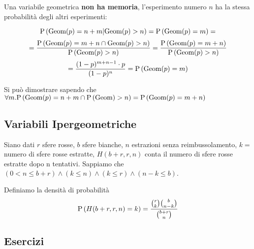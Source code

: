 Una variabile geometrica \textbf{non ha memoria}, l'esperimento numero $ n $ ha la stessa probabilità degli altri esperimenti:

\[ \text{P}\left(\text{Geom}(p) = n+m | \text{Geom}(p) > n\right) = \text{P}\left(\text{Geom}(p) = m\right)  = \]
\[ = \dfrac{\text{P}\left(\text{Geom}(p) = m + n \cap \text{Geom}(p) > n\right)}{\text{P}\left(\text{Geom}(p) > n\right)} = \dfrac{\text{P}\left(\text{Geom}(p) = m+n\right)}{\text{P}\left(\text{Geom}(p) > n\right)}\] 
\[= \dfrac{(1-p)^{m+n-1} \cdot p}{(1-p)^n} = \text{P}\left(\text{Geom}(p) = m\right) \]

Si può dimostrare sapendo che $ \forall m . \text{P}\left(\text{Geom}(p) = n+m \cap \text{P}\left(\text{Geom}\right) > n\right) = \text{P}\left(\text{Geom}(p) = m+n\right) $

\subsection{Variabili Ipergeometriche}

Siano dati $ r $ sfere rosse, $ b $ sfere bianche, $ n $ estrazioni senza reimbussolamento, $ k = $ numero di sfere rosse estratte, $ H(b+r, r, n) $ conta il numero di sfere rosse estratte dopo n tentativi. Sappiamo che $ (0 < n \leq b + r) \land (k \leq n)  \land (k \leq r) \land (n-k \leq b) $.

Definiamo la densità di probabilità
\[ \text{P}\left(H(b+r, r, n) = k\right) = \dfrac{\binom{r}{k} \binom{b}{n-k}}{\binom{b+r}{n}} \] 

\subsection{Esercizi}

